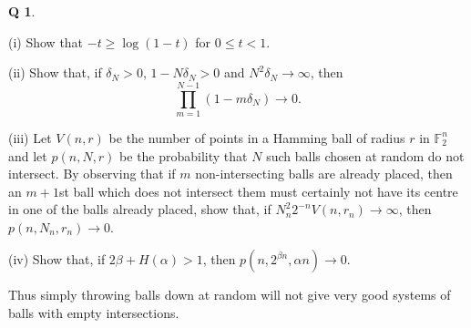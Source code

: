 \documentclass[12pt,a4paper]{article}
\theoremstyle{plain}
\theoremstyle{definition}
\newtheorem{question}[theorem]{Q}
\begin{document}
    \begin{question}
        \label{E;random ball}\label{C2.13}

        (i) Show that $-t\geq \log(1-t)$ for $0\leq t<1$.

        (ii) Show that, if $\delta_{N}>0$, $1-N\delta_{N}>0$ and
        $N^{2}\delta_{N}\rightarrow\infty$, then
        \[\prod_{m=1}^{N-1}(1-m\delta_{N})\rightarrow 0.\]

        (iii) Let $V(n,r)$ be the number of points in a Hamming
        ball of radius $r$ in ${\mathbb F}_{2}^{n}$ and
        let $p(n,N,r)$ be the probability that $N$ such
        balls chosen at random do not intersect.
        By observing that if $m$ non-intersecting
        balls are already placed, then an $m+1$st ball
        which does not intersect them
        must certainly not have its centre
        in one of the balls already placed,
        show that, if $N_{n}^{2}2^{-n}V(n,r_{n})\rightarrow\infty$,
        then  $p(n,N_{n},r_{n})\rightarrow 0$.

        (iv) Show that,
        if $2\beta+H(\alpha)>1$,
        then $p(n,2^{\beta n},\alpha n)\rightarrow 0$.

        Thus simply throwing balls down at random will not
        give very good systems of balls with empty intersections.
    \end{question}
    \newpage
\end{document}
